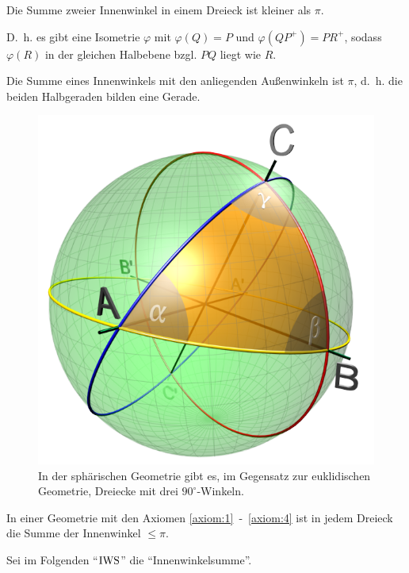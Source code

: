 \begin{folgerung}\label{folgerung:14.10}%
    Die Summe zweier Innenwinkel in einem Dreieck ist kleiner als $\pi$.
\end{folgerung}

D.~h. es gibt eine Isometrie $\varphi$ mit $\varphi(Q) = P$
und $\varphi(QP^+) = PR^+$, sodass $\varphi(R)$ in der gleichen
Halbebene bzgl. $PQ$ liegt wie $R$.

\begin{beweis}
    Die Summe eines Innenwinkels mit den anliegenden Außenwinkeln ist
    $\pi$, d.~h. die beiden Halbgeraden bilden eine Gerade.
\end{beweis}

\begin{figure}[htp]
    \centering
    \includegraphics[width=0.4\linewidth, keepaspectratio]{figures/Spherical_triangle_3d_opti.png} 
    \caption{In der sphärischen Geometrie gibt es, im Gegensatz zur euklidischen Geometrie, Dreiecke mit drei $90^\circ$-Winkeln.}
    \label{fig:spherical-triangle}
\end{figure}

\begin{proposition}\label{prop:14.11}%
    In einer Geometrie mit den Axiomen \ref{axiom:1}~-~\ref{axiom:4}
    ist in jedem Dreieck die Summe der Innenwinkel $\leq \pi$.
\end{proposition}

Sei im Folgenden \enquote{$\operatorname{IWS}$} die \enquote{Innenwinkelsumme}.

